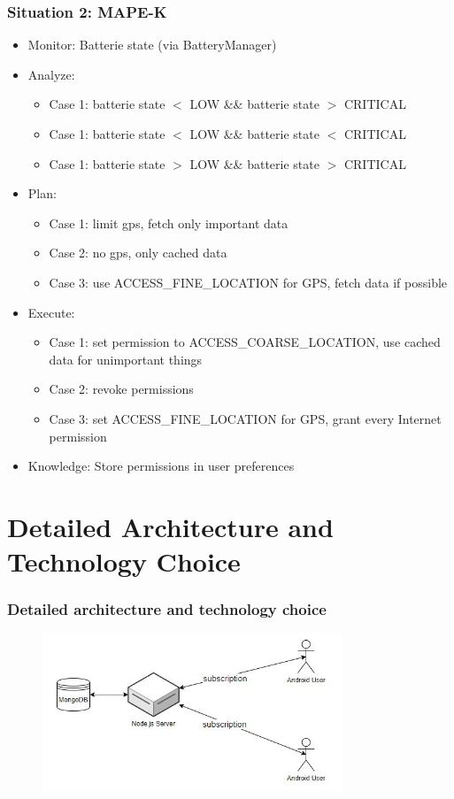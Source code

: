 \documentclass[aspectratio=169]{beamer}
\begin{document}
\begin{frame}   
	\frametitle{Situation 2: MAPE-K}
	\begin{itemize}
		\item Monitor: Batterie state (via BatteryManager)
		\item Analyze: 
			 \begin{itemize} 
				\item Case 1: batterie state $<$ LOW \&\& batterie state $>$ CRITICAL
				\item Case 1: batterie state $<$ LOW \&\& batterie state $<$ CRITICAL
				\item Case 1: batterie state $>$ LOW \&\& batterie state $>$ CRITICAL
			\end{itemize}
		\item Plan:
			\begin{itemize}
				\item Case 1: limit gps, fetch only important data 
				\item Case 2: no gps, only cached data
				\item Case 3: use ACCESS\_FINE\_LOCATION for GPS, fetch data if possible
			\end{itemize}
		\item Execute:
			\begin{itemize}
				\item Case 1: set permission to ACCESS\_COARSE\_LOCATION, use cached data for unimportant things
    				\item Case 2: revoke permissions
    				\item Case 3: set ACCESS\_FINE\_LOCATION for GPS, grant every Internet permission
			\end{itemize}
		\item Knowledge: Store permissions in user preferences
	\end{itemize}
\end{frame}





\section{Detailed Architecture and Technology Choice}
\begin{frame}
	\frametitle{Detailed architecture and technology choice}
	 \begin{figure}
		\centering
		\includegraphics[width=0.8\textwidth]{media/architecture.jpg}
	\end{figure}
\end{frame}
\end{document}
